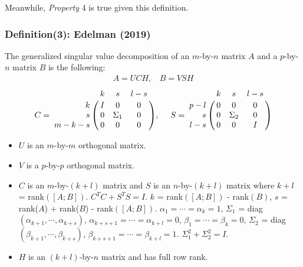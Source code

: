             Meanwhile, \textit{Property} 4 is true given this definition. 
        
        
        \subsubsection{Definition(3): Edelman (2019) \cite{edelman2019gsvd}}
        
        The generalized singular value decomposition of an $m$-by-$n$ matrix $A$ and a $p$-by-$n$ matrix $B$ is the following: 
        \begin{align} \label{eq-def-edelman}
            A = UCH, \ \   \ \ B = VSH
        \end{align}
         \begin{displaymath}
            C = \bordermatrix{ & k & s & l-s  \cr
            \hfill k & I & 0 & 0\cr
            \hfill s & 0 & \Sigma_1 & 0\cr
            \hfill m-k-s & 0 & 0 & 0}, \  \ \ \
            S = \bordermatrix{ & k & s & l-s \cr
            \hfill p-l & 0 & 0 & 0\cr
            \hfill s & 0 & \Sigma_2 & 0\cr
            \hfill l-s & 0 & 0 & I}
        \end{displaymath}
        
        \begin{itemize}
            \item $U$ is an $m$-by-$m$ orthogonal matrix.
            \item $V$ is a $p$-by-$p$ orthogonal matrix.
            \item $C$ is an $m$-by-$(k+l)$ matrix and $S$ is an $n$-by-$(k+l)$ matrix where $k+l$ = rank$([A; B])$. $C^T C + S^T S = I$. $k$ = rank$([A; B])$ - rank$(B)$, $s$ = rank($A$) + rank($B$) - rank$([A; B])$. $\alpha_1 = \cdots = \alpha_k = 1$, $\Sigma_1$ = diag$(\alpha_{k+1}, \cdots, \alpha_{k+s})$, $\alpha_{k+s+1} = \cdots = \alpha_{k+l} = 0$, $\beta_1 = \cdots = \beta_k = 0$, $\Sigma_2$ = diag$(\beta_{k+1}, \cdots, \beta_{k+s})$, $\beta_{k+s+1} = \cdots = \beta_{k+l} = 1$. $\Sigma_1^2 + \Sigma_2^2 = I$.
            \item $H$ is an $(k+l)$-by-$n$ matrix and has full row rank.
        \end{itemize}
        
